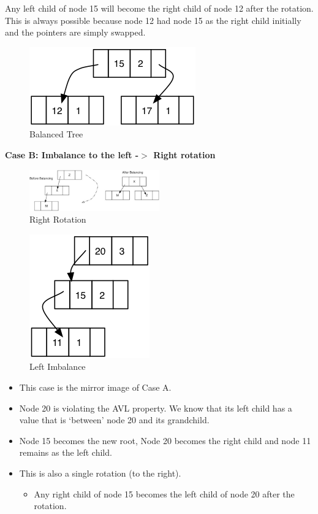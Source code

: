 Any left child of node 15 will become the right child of node 12 after the rotation. This is always possible because node 12 had node 15 as the right child initially and the pointers are simply swapped.

\begin{figure}[H]
\centering
\includegraphics{pictures/tree17.png}
\caption{Balanced Tree}
\label{fig:tree17}
\end{figure}


\textbf{Case B: Imbalance to the left -$>$ Right rotation}

\begin{figure}[H]
\centering
\includegraphics[width=0.5\textwidth]{pictures/rightrotate.jpg}
\caption{Right Rotation}
\label{fig:rightrotate}
\end{figure}
\begin{figure}[H]
\centering
\includegraphics{pictures/tree18.png}
\caption{Left Imbalance}
\label{fig:tree18}
\end{figure}
\begin{itemize}
	\item This case is the mirror image of Case A.
	\item Node 20 is violating the AVL property. We know that its left child has a value that is ‘between’ node 20 and its grandchild.
	\item Node 15 becomes the new root, Node 20 becomes the right child and node 11 remains as the left child.
	\item This is also a single rotation (to the right).
\begin{itemize}
	\item Any right child of node 15 becomes the left child of node 20 after the rotation.
\end{itemize}
\end{itemize}


